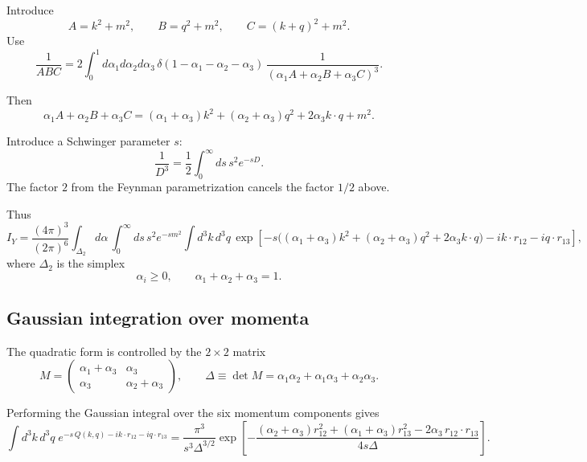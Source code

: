 Introduce
\begin{equation}
A=k^2+m^2,\qquad B=q^2+m^2,\qquad C=(k+q)^2+m^2.
\end{equation}
Use
\begin{equation}
\frac{1}{ABC}
=
2\int_0^1 d\alpha_1 d\alpha_2 d\alpha_3\,
\delta(1-\alpha_1-\alpha_2-\alpha_3)\,
\frac{1}{(\alpha_1 A+\alpha_2 B+\alpha_3 C)^3}.
\end{equation}

Then
\begin{equation}
\alpha_1 A+\alpha_2 B+\alpha_3 C
=
(\alpha_1+\alpha_3)k^2+(\alpha_2+\alpha_3)q^2+2\alpha_3 k\cdot q + m^2.
\end{equation}

Introduce a Schwinger parameter $s$:
\begin{equation}
\frac{1}{D^3}
=
\frac{1}{2}\int_0^\infty ds\, s^2 e^{-sD}.
\end{equation}
The factor $2$ from the Feynman parametrization cancels the factor $1/2$ above.

Thus
\begin{equation}
I_Y
=
\frac{(4\pi)^3}{(2\pi)^6}
\int_{\Delta_2} d\alpha\,
\int_0^\infty ds\, s^2 e^{-s m^2}
\int d^3k\,d^3q\,
\exp\left[
-s\Big((\alpha_1+\alpha_3)k^2+(\alpha_2+\alpha_3)q^2+2\alpha_3 k\cdot q\Big)
-i k\cdot r_{12}
-i q\cdot r_{13}
\right],
\end{equation}
where $\Delta_2$ is the simplex
\begin{equation}
\alpha_i\ge 0,\qquad \alpha_1+\alpha_2+\alpha_3=1.
\end{equation}

\subsection{Gaussian integration over momenta}

The quadratic form is controlled by the $2\times 2$ matrix
\begin{equation}
M=
\begin{pmatrix}
\alpha_1+\alpha_3 & \alpha_3\\
\alpha_3 & \alpha_2+\alpha_3
\end{pmatrix},
\qquad
\Delta \equiv \det M
=
\alpha_1\alpha_2+\alpha_1\alpha_3+\alpha_2\alpha_3.
\end{equation}

Performing the Gaussian integral over the six momentum components gives
\begin{equation}
\int d^3k\,d^3q\; e^{-s\,Q(k,q)-i k\cdot r_{12}-i q\cdot r_{13}}
=
\frac{\pi^3}{s^3 \Delta^{3/2}}
\exp\left[
-\frac{
(\alpha_2+\alpha_3) r_{12}^2 + (\alpha_1+\alpha_3) r_{13}^2 - 2\alpha_3\, r_{12}\cdot r_{13}
}{
4 s \Delta
}
\right].
\end{equation}

